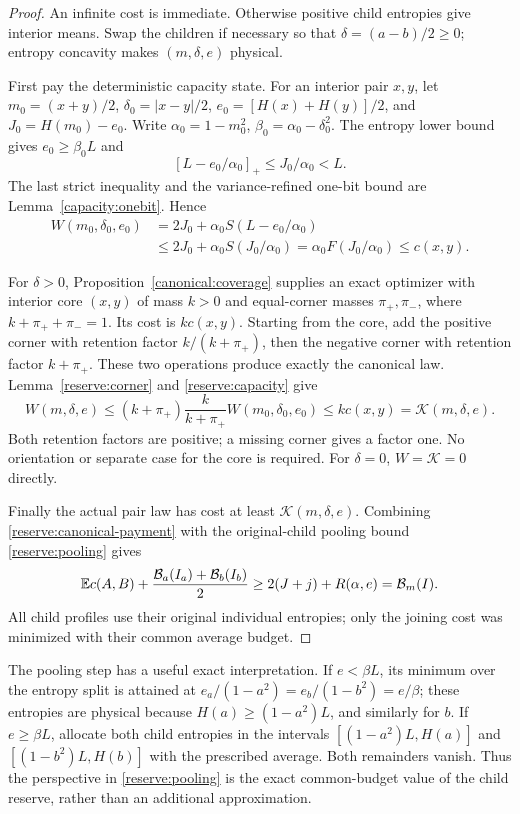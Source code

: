 \begin{proof}
An infinite cost is immediate.  Otherwise positive child entropies
give interior means.  Swap the children if necessary so that
$\delta=(a-b)/2\ge0$; entropy concavity makes $(m,\delta,e)$
physical.

First pay the deterministic capacity state.  For an interior pair
$x,y$, let $m_0=(x+y)/2$, $\delta_0=|x-y|/2$,
$e_0=[H(x)+H(y)]/2$, and $J_0=H(m_0)-e_0$.
Write $\alpha_0=1-m_0^2$, $\beta_0=\alpha_0-\delta_0^2$.
The entropy lower bound gives $e_0\ge\beta_0L$ and
\[
 [L-e_0/\alpha_0]_+\le J_0/\alpha_0<L.
\]
The last strict inequality and the variance-refined one-bit bound
are Lemma~\ref{capacity:onebit}.  Hence
\begin{equation}
 \begin{aligned}
 W(m_0,\delta_0,e_0)
 &=2J_0+\alpha_0S(L-e_0/\alpha_0)\\
 &\le2J_0+\alpha_0S(J_0/\alpha_0)
 =\alpha_0F(J_0/\alpha_0)\le c(x,y).
 \end{aligned}
 \label{reserve:capacity}
\end{equation}

For $\delta>0$, Proposition~\ref{canonical:coverage} supplies
an exact optimizer with interior core $(x,y)$ of mass $k>0$
and equal-corner masses $\pi_+,\pi_-$, where
$k+\pi_++\pi_-=1$.  Its cost is $k c(x,y)$.
Starting from the core, add the positive corner with retention
factor $k/(k+\pi_+)$, then the negative corner with retention
factor $k+\pi_+$.  These two operations produce exactly the
canonical law.  Lemma~\ref{reserve:corner} and
\eqref{reserve:capacity} give
\begin{equation}
 W(m,\delta,e)
 \le(k+\pi_+)\frac{k}{k+\pi_+}W(m_0,\delta_0,e_0)
 \le k c(x,y)=\mathcal K(m,\delta,e).
 \label{reserve:canonical-payment}
\end{equation}
Both retention factors are positive; a missing corner gives a
factor one.  No orientation or separate case for the core is required.
For $\delta=0$, $W=\mathcal K=0$ directly.

Finally the actual pair law has cost at least
$\mathcal K(m,\delta,e)$.  Combining
\eqref{reserve:canonical-payment} with the original-child pooling
bound \eqref{reserve:pooling} gives
\[
 \mathbb E c(A,B)+\frac{\mathcal B_a(I_a)+\mathcal B_b(I_b)}2
 \ge2(J+j)+R(\alpha,e)=\mathcal B_m(I).
\]
All child profiles use their original individual entropies; only
the joining cost was minimized with their common average budget.
\end{proof}

The pooling step has a useful exact interpretation.  If
$e<\beta L$, its minimum over the entropy split is attained at
$e_a/(1-a^2)=e_b/(1-b^2)=e/\beta$; these entropies are
physical because $H(a)\ge(1-a^2)L$, and similarly for $b$.
If $e\ge\beta L$, allocate both child entropies in the intervals
$[(1-a^2)L,H(a)]$ and $[(1-b^2)L,H(b)]$ with the prescribed
average.  Both remainders vanish.  Thus the perspective in
\eqref{reserve:pooling} is the exact common-budget value of the
child reserve, rather than an additional approximation.
